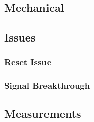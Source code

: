 \section{Mechanical}

\section{Issues}

\subsection{ Reset Issue}

\subsection{Signal Breakthrough}


\section{Measurements}


\chapter{}

\chapter{}